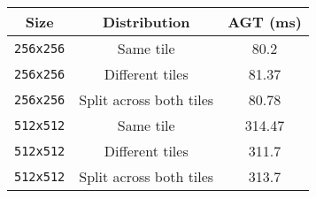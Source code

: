 {\footnotesize
\begin{tabular}{|c|c|c|}
    \hline Size & Distribution & AGT (ms) \\
    \hline \verb|256x256| & Same tile & 80.2 \\
    \verb|256x256| & Different tiles & 81.37 \\
    \verb|256x256| & Split across both tiles & 80.78 \\
    \hline \verb|512x512| & Same tile & 314.47 \\
    \verb|512x512| & Different tiles & 311.7 \\
    \verb|512x512| & Split across both tiles & 313.7 \\
    \hline
\end{tabular}}